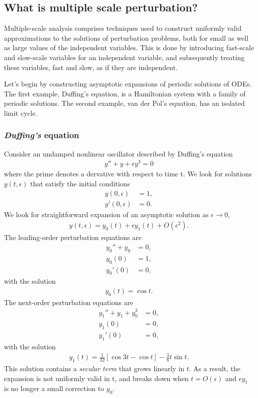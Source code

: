 \subsection{What is multiple scale perturbation?}
Multiple-scale analysis comprises techniques used to construct uniformly valid approximations to the solutions of perturbation problems, both for small as well as large values of the independent variables. This is done by introducing fast-scale and slow-scale variables for an independent variable, and subsequently treating these variables, fast and slow, as if they are independent.

Let's begin by constructing asymptotic expansions of periodic solutions of ODEs. The first example, Duffing's equation, is a Hamiltonian system with a family of periodic solutions. The second example, van der Pol's equation, has an isolated limit cycle. 

\subsubsection{\emph{Duffing's} equation}
Consider an undamped nonlinear oscillator described by Duffing's equation 
\begin{align}
	y''+y+ \epsilon y^3 = 0
\end{align}
where the prime denotes a dervative with respect to time t. We look for solutions $y(t,\epsilon)$ that satisfy the initial conditions
\begin{align}
	y(0,\epsilon) &= 1, \\
	y'(0,\epsilon) &= 0.
\end{align}
We look for straightforward expansion of an asymptotic solution as $\epsilon \rightarrow 0$, 
\begin{align}
	y(t,\epsilon) = y_0(t) + \epsilon y_1(t) + O(\epsilon^2).
\end{align}
The leading-order perturbation equations are
\begin{align}
	y_0''+y_0 &= 0, \\
	y_0(0) &= 1, \\
	y_0'(0) &= 0,
\end{align}
with the solution
\begin{align}
	y_0(t) = \cos{t}.
\end{align}
The next-order perturbation equations are
\begin{align}
	y_1''+y_1+y_0^3 &= 0, \\
	y_1(0) &= 0, \\
	y_1'(0) &= 0, 
\end{align}
with the solution
\begin{align}
	y_1(t) = \frac{1}{32} \left[\cos{3t} - \cos{t} \right] - \frac{3}{8} t \sin{t}.
\end{align}
This solution contains a \textit{secular term} that grows linearly in $t$. As a result, the expansion is not uniformly valid in t, and breaks down when $t = O(\epsilon)$ and $\epsilon y_1$ is no longer a small correction to $y_0$.

